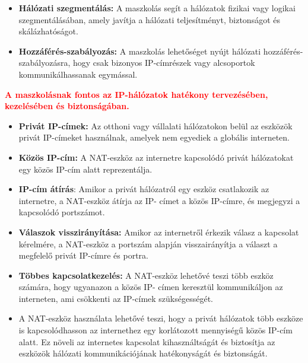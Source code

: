 \documentclass[11pt,a4paper]{article}
\begin{document}
\begin{tcolorbox}[colback=blue!5!white,colframe=blue!50!black,title= 43. Ismertesse az internetes címek maszkolási algoritmusát!]
\begin{itemize}
                    \item \textbf{Hálózati szegmentálás:} A maszkolás segít a hálózatok fizikai vagy logikai szegmentálásában, amely javítja a hálózati teljesítményt, biztonságot és skálázhatóságot.
                    \item \textbf{Hozzáférés-szabályozás:} A maszkolás lehetőséget nyújt hálózati hozzáférés-szabályozásra, hogy csak bizonyos IP-címrészek vagy alcsoportok kommunikálhassanak egymással.
                \end{itemize}
                \textcolor{red}{\textbf{A maszkolásnak fontos az IP-hálózatok hatékony tervezésében, kezelésében és biztonságában.}}
            \end{tcolorbox}
            
            \begin{tcolorbox}[colback=blue!5!white,colframe=blue!50!black,title= 44. Ismertesse a NAT (Network Address Translator) eszközt használatát az internethez való kapcsolódásban!]
                \begin{itemize}
                    \item \textbf{Privát IP-címek:} Az otthoni vagy vállalati hálózatokon belül az eszközök privát IP-címeket használnak, amelyek nem egyediek a globális interneten.
                    \item \textbf{Közös IP-cím:} A NAT-eszköz az internetre kapcsolódó privát hálózatokat egy közös IP-cím alatt reprezentálja.
                    \item \textbf{IP-cím átírás}: Amikor a privát hálózatról egy eszköz csatlakozik az internetre, a NAT-eszköz átírja az IP- címet a közös IP-címre, és megjegyzi a kapcsolódó portszámot.
                    \item \textbf{Válaszok visszirányítása:} Amikor az internetről érkezik válasz a kapcsolat kérelmére, a NAT-eszköz a portszám alapján visszairányítja a választ a megfelelő privát IP-címre és portra.
                    \item \textbf{Többes kapcsolatkezelés:} A NAT-eszköz lehetővé teszi több eszköz számára, hogy ugyanazon a közös IP- címen keresztül kommunikáljon az interneten, ami csökkenti az IP-címek szükségességét.
                    \item A NAT-eszköz használata lehetővé teszi, hogy a privát hálózatok több eszköze is kapcsolódhasson az internethez egy korlátozott mennyiségű közös IP-cím alatt. Ez növeli az internetes kapcsolat kihasználtságát és biztosítja az eszközök hálózati kommunikációjának hatékonyságát és biztonságát.
                \end{itemize}
            \end{tcolorbox}
\end{document}
